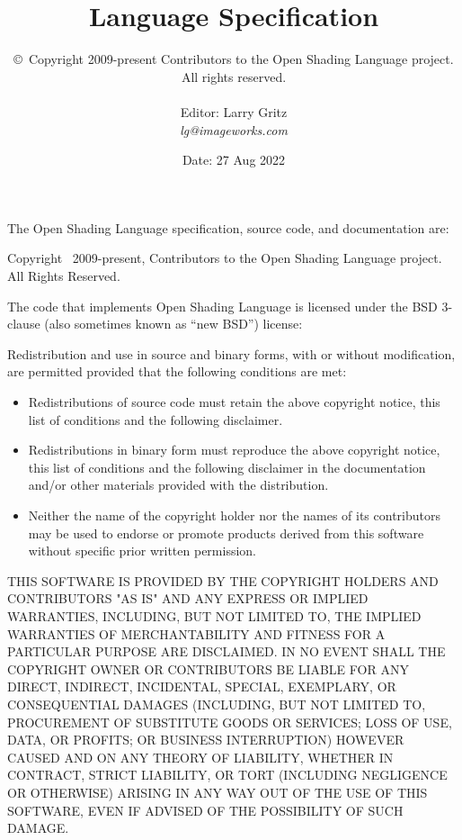 \documentclass[11pt,letterpaper]{book}
\title{
{\Huge{\bf \product}
{\bf\sffamily \versionnumber} \medskip \\ \huge
Language Specification
} \bigskip }
\author{
\copyright\ Copyright 2009-present Contributors to the Open Shading Language project. \\
All rights reserved.
 \bigskip \\
\vspace{1in} \\
Editor: Larry Gritz \\
\emph{lg@imageworks.com}
}
\date{{\large Date: 27 Aug 2022 \\
}
\bigskip
\bigskip
\bigskip
\bigskip
}
\begin{document}
\frontmatter

\maketitle

\newpage
\label{speccopyr}

\vspace*{0.2in}

\noindent The Open Shading Language specification, source code, and
documentation are:

\vspace*{0.2in}

Copyright \textcopyright\ 2009-present, Contributors to the Open Shading
Language project. All Rights Reserved.

\vspace{0.5in}

The code that implements Open Shading Language is licensed under
the BSD 3-clause (also sometimes known as ``new BSD'') license:

\vspace{0.25in}

Redistribution and use in source and binary forms, with or without
modification, are permitted provided that the following conditions are
met:

\begin{itemize}
\item Redistributions of source code must retain the above copyright
  notice, this list of conditions and the following disclaimer.
\item Redistributions in binary form must reproduce the above copyright
  notice, this list of conditions and the following disclaimer in the
  documentation and/or other materials provided with the distribution.
\item Neither the name of the copyright holder nor the names of its
  contributors may be used to endorse or promote products derived from
  this software without specific prior written permission.
\end{itemize}

THIS SOFTWARE IS PROVIDED BY THE COPYRIGHT HOLDERS AND CONTRIBUTORS
"AS IS" AND ANY EXPRESS OR IMPLIED WARRANTIES, INCLUDING, BUT NOT
LIMITED TO, THE IMPLIED WARRANTIES OF MERCHANTABILITY AND FITNESS FOR
A PARTICULAR PURPOSE ARE DISCLAIMED. IN NO EVENT SHALL THE COPYRIGHT
OWNER OR CONTRIBUTORS BE LIABLE FOR ANY DIRECT, INDIRECT, INCIDENTAL,
SPECIAL, EXEMPLARY, OR CONSEQUENTIAL DAMAGES (INCLUDING, BUT NOT
LIMITED TO, PROCUREMENT OF SUBSTITUTE GOODS OR SERVICES; LOSS OF USE,
DATA, OR PROFITS; OR BUSINESS INTERRUPTION) HOWEVER CAUSED AND ON ANY
THEORY OF LIABILITY, WHETHER IN CONTRACT, STRICT LIABILITY, OR TORT
(INCLUDING NEGLIGENCE OR OTHERWISE) ARISING IN ANY WAY OUT OF THE USE
OF THIS SOFTWARE, EVEN IF ADVISED OF THE POSSIBILITY OF SUCH DAMAGE.
\end{document}
